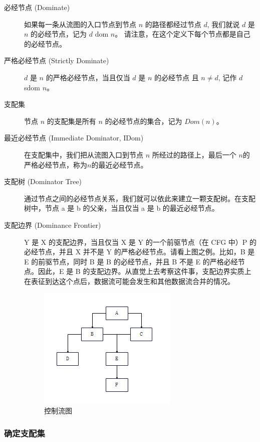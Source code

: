 \begin{description}
    \item[必经节点 (Dominate)]
    如果每一条从流图的入口节点到节点 $n$ 的路径都经过节点 $d$, 我们就说 $d$ 是 $n$ 的必经节点，记为 $d$ dom $n$。
    请注意，在这个定义下每个节点都是自己的必经节点。

    \item[严格必经节点 (Strictly Dominate)]
    $d$ 是 $n$ 的严格必经节点，当且仅当 $d$ 是 $n$ 的必经节点 且 $n\neq d$, 记作 $d$ sdom $n$。

    \item[支配集]
    节点 $n$ 的支配集是所有 $n$ 的必经节点的集合，记为 $\mathit{Dom}(n)$。

    \item[最近必经节点 (Immediate Dominator, IDom)]
    在支配集中，我们把从流图入口到节点 $n$ 所经过的路径上，最后一个 $n$的严格必经节点，称为$n$的最近必经节点。

    \item[支配树 (Dominator Tree)]
    通过节点之间的必经节点关系，我们就可以依此来建立一颗支配树。在支配树中，节点 a 是 b 的父亲，当且仅当 a 是 b 的最近必经节点。

    \item[支配边界 (Dominance Frontier)]
    Y 是 X 的支配边界，当且仅当 X 是 Y 的一个前驱节点（在 CFG 中）P 的必经节点，并且 X 并不是 Y 的严格必经节点。请看上图之例。比如，B 是 E 的前驱节点，同时 B 是 B 的必经节点，并且 B 不是 E 的严格必经节点。因此，E 是 B 的支配边界。从直觉上去考察这件事，支配边界实质上在表征到达这个点后，数据流可能会发生和其他数据流合并的情况。
    \begin{figure}
        \centering
        \includegraphics[width=0.5\linewidth]{image/CTG.jpg}
        \caption{控制流图}
        \label{fig:enter-label}
    \end{figure}
\end{description}

\subsubsection{确定支配集}

